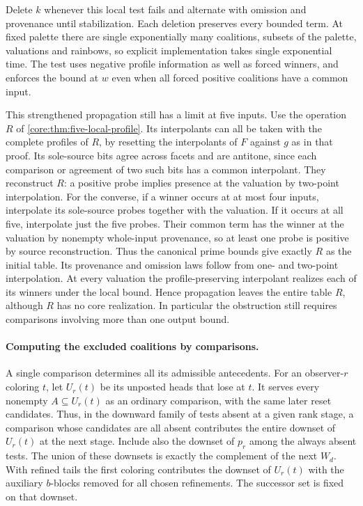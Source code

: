 Delete $k$ whenever this local test fails and
alternate with omission and provenance until
stabilization. Each deletion preserves every
bounded term. At fixed palette there are
single exponentially many coalitions, subsets
of the palette, valuations and rainbows, so
explicit implementation takes single exponential
time. The test uses negative profile information
as well as forced winners, and enforces the bound
at $w$ even when all forced positive coalitions
have a common input.

This strengthened propagation still has a limit
at five inputs. Use the operation $R$ of
\cref{core:thm:five-local-profile}. Its interpolants
can all be taken with the complete profiles of $R$,
by resetting the interpolants of $F$ against $g$
as in that proof. Its sole-source bits agree across
facets and are antitone, since each comparison or
agreement of two such bits has a common interpolant.
They reconstruct $R$: a positive probe implies
presence at the valuation by two-point interpolation.
For the converse, if a winner occurs at at most
four inputs, interpolate its sole-source probes
together with the valuation. If it occurs at all
five, interpolate just the five probes. Their
common term has the winner at the valuation by
nonempty whole-input provenance, so at least
one probe is positive by source reconstruction.
Thus the canonical prime bounds give exactly $R$
as the initial table. Its provenance and omission
laws follow from one- and two-point interpolation.
At every valuation the profile-preserving
interpolant realizes each of its winners under
the local bound. Hence propagation leaves the
entire table $R$, although $R$ has no core
realization. In particular the obstruction still
requires comparisons involving more than one
output bound.

\paragraph{Computing the excluded coalitions by comparisons.}
A single comparison determines all its admissible
antecedents. For an observer-$r$ coloring $t$,
let $U_r(t)$ be its unposted heads that lose
at $t$. It serves every nonempty $A\subseteq U_r(t)$
as an ordinary comparison, with the same later
reset candidates. Thus, in the downward family
of tests absent at a given rank stage, a comparison
whose candidates are all absent contributes the
entire downset of $U_r(t)$ at the next stage.
Include also the downset of $p_r$ among the
always absent tests. The union of these downsets
is exactly the complement of the next $W_d$.
With refined tails the first coloring contributes the
downset of $U_r(t)$ with the auxiliary $b$-blocks removed
for all chosen refinements. The successor set is fixed
on that downset.

